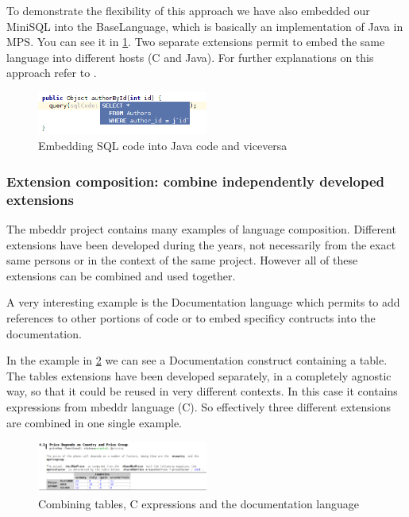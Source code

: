 \documentclass[preprint,numbers,10pt]{sigplanconf}
\begin{document}
To demonstrate the flexibility of this approach we have also embedded our MiniSQL into the BaseLanguage, which is basically an implementation of Java in MPS. You can see it in \ref{fig:sqlembeddingjava}. Two separate extensions permit to embed the same language into different hosts (C and Java). For further explanations on this approach refer to \cite{Tomassetti2013}.

\begin{figure}[H]
	\centering
	\includegraphics[width=0.50\textwidth]{screens/minisql_embedded_java.png}
	\caption{Embedding SQL code into Java code and viceversa}
	\label{fig:sqlembeddingjava}
\end{figure}

\subsubsection{Extension composition: combine independently developed extensions}
\label{evr:langcomp}

The mbeddr project contains many examples of language composition. Different extensions have been developed during the years, not necessarily from the exact same persons or in the context of the same project. However all of these extensions can be combined and used together.

A very interesting example is the Documentation language which permits to add references to other portions of code or to embed specificy contructs into the documentation.

In the example in \ref{fig:extensioncomposition} we can see a Documentation construct containing a table. The tables extensions have been developed separately, in a completely agnostic way, so that it could be reused in very different contexts. In this case it contains expressions from mbeddr language (C). So effectively three different extensions are combined in one single example.

\begin{figure}[H]
	\centering
	\includegraphics[width=0.50\textwidth]{screens/extension_composition.png}
	\caption{Combining tables, C expressions and the documentation language}
	\label{fig:extensioncomposition}
\end{figure}
\end{document}

